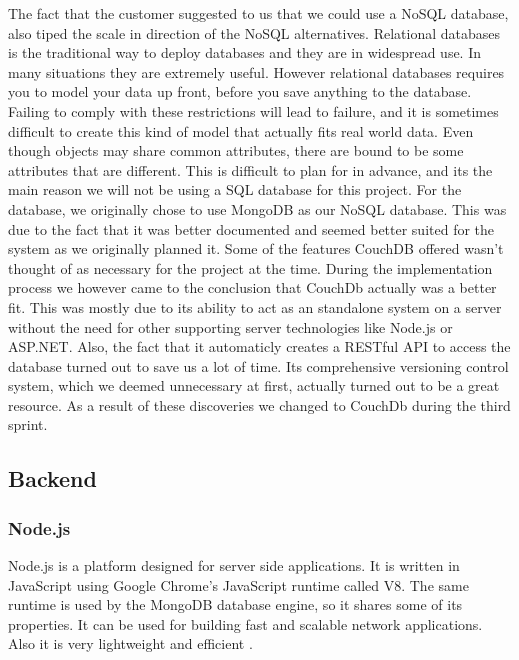 The fact that the customer suggested to us that we could use a NoSQL database, also tiped the scale in direction of the NoSQL alternatives. 
\newline
\newline
Relational databases is the traditional way to deploy databases and they are in widespread use. In many situations they are extremely useful. However relational databases requires you to model your data up front, before you save anything to the database. Failing to comply with these restrictions will lead to failure, and it is sometimes difficult to create this kind of model that actually fits real world data. Even though objects may share common attributes, there are bound to be some attributes that are different. This is difficult to plan for in advance, and its the main reason we will not be using a SQL database for this project.
\newline
\newline
For the database, we originally chose to use MongoDB as our NoSQL database. This was due to the fact that it was better documented and seemed better suited for the system as we originally planned it. Some of the features CouchDB offered wasn't thought of as necessary for the project at the time. During the implementation process we however came to the conclusion that CouchDb actually was a better fit. This was mostly due to its ability to act as an standalone system on a server without the need for other supporting server technologies like Node.js or ASP.NET. Also, the fact that it automaticly creates a RESTful API to access the database turned out to save us a lot of time. Its comprehensive versioning control system, which we deemed unnecessary at first, actually turned out to be a great resource. As a result of these discoveries we changed to CouchDb during the third sprint.


\subsection{Backend}
\subsubsection*{Node.js}
Node.js is a platform designed for server side applications. It is written in JavaScript using Google Chrome's JavaScript runtime called V8. The same runtime is used by the MongoDB database engine, so it shares some of its properties. It can be used for building fast and scalable network applications. Also it is very lightweight and efficient \cite{nodejs-about}.

